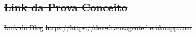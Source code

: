 \documentclass[
    12pt,               %
    openright,          %
    oneside,
    a4paper,            %
    paginasA3,  %
    BIBLATEX,           %
    REFINDENT,          %
    MODELO,             %
    TODO,               %
    english,            %
    brazil              %
    ]{ifsp-spo-inf-ctds} %
\providecommand{\DIFdel}[1]{{\protect\color{red}\sout{#1}}}                      %
\providecommand{\DIFdelbegin}{} %
\providecommand{\DIFdelend}{} %
\providecommand{\DIFdelFL}[1]{\DIFdel{#1}} %
\begin{document}
\begin{apendicesenv}
\section{\DIFdelFL{Link da Prova Conceito}}
\addtocounter{section}{-1}%
\DIFdelFL{Link do Blog}%
\DIFdelFL{https://https://dev-diversagente.herokuapp.com}%




\DIFdelend %
\DIFdelbegin %





\end{apendicesenv}
\end{document}
